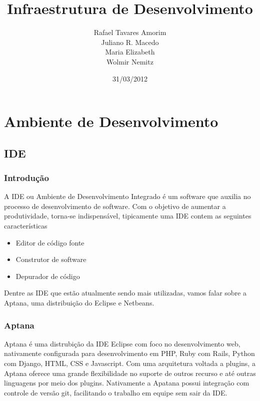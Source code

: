 \documentclass[12pt,a4paper]{article}
\begin{document}
\title{Infraestrutura de Desenvolvimento}






\author{
Rafael Tavares Amorim \\
Juliano R. Macedo \\
Maria Elizabeth \\
Wolmir Nemitz
}




\date{31/03/2012}
\maketitle
\thispagestyle{empty}
\clearpage
\tableofcontents
\thispagestyle{empty}
\clearpage
\section{Ambiente de Desenvolvimento}
	\subsection{IDE}
		\subsubsection{Introdução}

				A IDE ou Ambiente de Desenvolvimento Integrado é um software que auxilia no
				processo de desenvolvimento de software. Com o objetivo de aumentar a
				produtividade, torna-se indispensável, tipicamente uma IDE contem as
				seguintes características
				\begin{itemize}
					\item Editor de código fonte
					\item Construtor de software
					\item Depurador de código
				\end{itemize}
				
				Dentre as IDE que estão atualmente sendo mais utilizadas, vamos falar sobre
				a Aptana, uma distribuição do Eclipse e Netbeans.
		
		\subsubsection{Aptana}
			Aptana é uma distrubição da IDE Eclipse com foco no desenvolvimento web, nativamente configurada para
			desenvolvimento em PHP, Ruby com Rails, Python com Django, HTML, CSS e Javascript. Com uma arquitetura voltada a
			plugins, a Aptana oferece uma grande flexibilidade no suporte de outros recurso e até outras linguagens por meio dos
			plugins. Nativamente a Apatana possui integração com controle de versão git, facilitando o trabalho em equipe sem
			sair da IDE.
		
\end{document}
